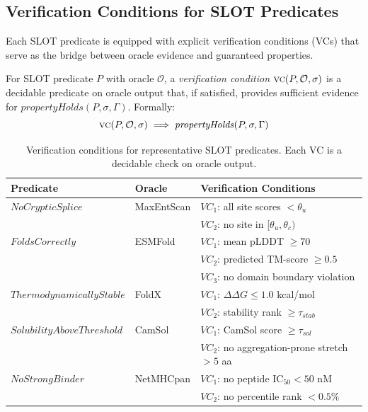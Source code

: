 \documentclass[acmsmall,review,anonymous]{acmart}
\newcommand{\seq}{\sigma}
\newcommand{\pred}{P}
\newcommand{\VC}{\textsc{vc}\xspace}
\begin{document}
\subsection{Verification Conditions for SLOT Predicates}\label{sec:vcs}

Each SLOT predicate is equipped with explicit verification conditions
(VCs) that serve as the bridge between oracle evidence and guaranteed
properties.

\begin{definition}
For SLOT predicate $\pred$ with oracle $\mathcal{O}$, a
\emph{verification condition} $\VC(\pred, \mathcal{O}, \seq)$ is a
decidable predicate on oracle output that, if satisfied, provides
sufficient evidence for $\mathit{propertyHolds}(\pred, \seq, \Gamma)$.
Formally:
\[
  \VC(\pred, \mathcal{O}, \seq) \;\Longrightarrow\;
  \mathit{propertyHolds}(\pred, \seq, \Gamma)
\]
\end{definition}

\begin{table}[t]
\centering
\caption{Verification conditions for representative SLOT predicates.
         Each VC is a decidable check on oracle output.}
\label{tab:vcs}
\begin{tabular}{llp{5.2cm}}
\toprule
\textbf{Predicate} & \textbf{Oracle} & \textbf{Verification Conditions} \\
\midrule
$\mathit{NoCrypticSplice}$ & MaxEntScan &
  $\mathit{VC}_1$: all site scores $< \theta_u$ \\
 & &
  $\mathit{VC}_2$: no site in $[\theta_u, \theta_c)$ \\
\midrule
$\mathit{FoldsCorrectly}$ & ESMFold &
  $\mathit{VC}_1$: mean pLDDT $\ge 70$ \\
 & &
  $\mathit{VC}_2$: predicted TM-score $\ge 0.5$ \\
 & &
  $\mathit{VC}_3$: no domain boundary violation \\
\midrule
$\mathit{ThermodynamicallyStable}$ & FoldX &
  $\mathit{VC}_1$: $\Delta\Delta G \le 1.0$ kcal/mol \\
 & &
  $\mathit{VC}_2$: stability rank $\ge \tau_{\mathit{stab}}$ \\
\midrule
$\mathit{SolubilityAboveThreshold}$ & CamSol &
  $\mathit{VC}_1$: CamSol score $\ge \tau_{\mathit{sol}}$ \\
 & &
  $\mathit{VC}_2$: no aggregation-prone stretch $> 5$ aa \\
\midrule
$\mathit{NoStrongBinder}$ & NetMHCpan &
  $\mathit{VC}_1$: no peptide IC$_{50} < 50$ nM \\
 & &
  $\mathit{VC}_2$: no percentile rank $< 0.5\%$ \\
\bottomrule
\end{tabular}
\end{table}
\end{document}
